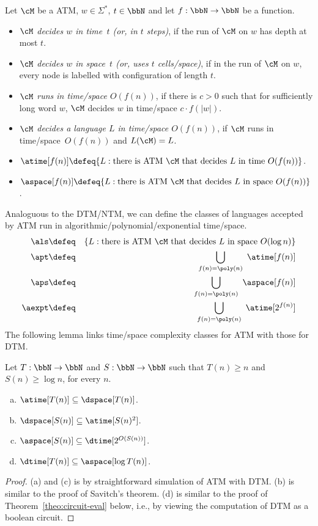 \documentclass[11pt, a4paper]{article}
\begin{document}
Let $\cM$ be a ATM, $w\in \Sigma^*$, $t\in \bbN$ and let $f:\bbN\to\bbN$ be a function.
\begin{itemize}
\item 
{\em $\cM$ decides $w$ in time~$t$ (or, in $t$ steps)},
if the run of $\cM$ on $w$ has depth at most $t$.
\item
{\em $\cM$ decides $w$ in space~$t$ (or, uses $t$ cells/space)},
if in the run of $\cM$ on $w$,
every node is labelled with configuration of length $t$.
\item
{\em $\cM$ runs in time/space $O(f(n))$}, if 
there is $c>0$ such that for sufficiently long word $w$,
$\cM$ decides $w$ in time/space $c\cdot f(|w|)$.

\item
{\em $\cM$ decides a language $L$ in time/space $O(f(n))$},
if $\cM$ runs in time/space~$O(f(n))$ and $L(\cM)=L$.
\item
$\atime[f(n)] \defeq 
\{L  :  \text{there is ATM}\ \cM \ \text{that decides} \ L \ \text{in time} \ O(f(n))\}$.
\item
$\aspace[f(n)] \defeq 
\{L  :  \text{there is ATM}\ \cM \ \text{that decides} \ L \ \text{in space} \ O(f(n))\}$.
\end{itemize}
Analoguous to the DTM/NTM,
we can define the classes of languages accepted by ATM run in algorithmic/polynomial/exponential time/space. 
\begin{eqnarray*}
\als & \defeq & \{L : \text{there is ATM} \ \cM \ \text{that decides}\ L \ \text{in space} \ O(\log n)\}
\\
\apt & \defeq & \bigcup_{f(n)=\poly(n)} \ \atime[f(n)]
\\
\aps & \defeq & \bigcup_{f(n)=\poly(n)} \ \aspace[f(n)]
\\
\aexpt & \defeq & \bigcup_{f(n)=\poly(n)} \ \atime[2^{f(n)}]
\end{eqnarray*}
The following lemma links time/space complexity classes for ATM with those for DTM.

\begin{lemma}
\label{lemma:atm-dtm}
Let $T:\bbN\to\bbN$ and $S:\bbN\to\bbN$ such that $T(n)\geq n$ and $S(n)\geq \log n$, for every $n$.
\begin{enumerate}[(a)]
\item
$\atime[T(n)]\subseteq \dspace[T(n)]$.
\item
$\dspace[S(n)]\subseteq \atime [S(n)^2]$.
\item
$\aspace[S(n)]\subseteq \dtime [2^{O(S(n))}]$.
\item
$\dtime[T(n)]\subseteq \aspace [\log T(n)]$.
\end{enumerate}
\end{lemma}
\begin{proof}
(a) and (c) is by straightforward simulation of ATM with DTM.
(b) is similar to the proof of Savitch's theorem.
(d) is similar to the proof of Theorem~\ref{theo:circuit-eval} below,
i.e., by viewing the computation of DTM as a boolean circuit.
\end{proof}
\end{document}
